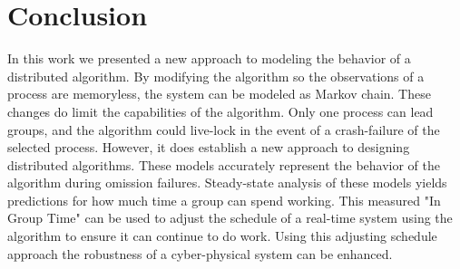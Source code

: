 
\section{Conclusion}

In this work we presented a new approach to modeling the behavior of a distributed algorithm.
By modifying the algorithm so the observations of a process are memoryless, the system can be modeled as Markov chain.
These changes do limit the capabilities of the algorithm.
Only one process can lead groups, and the algorithm could live-lock in the event of a crash-failure of the selected process.
However, it does establish a new approach to designing distributed algorithms.
These models accurately represent the behavior of the algorithm during omission failures.
Steady-state analysis of these models yields predictions for how much time a group can spend working.
This measured "In Group Time" can be used to adjust the schedule of a real-time system using the algorithm to ensure it can continue to do work.
Using this adjusting schedule approach the robustness of a cyber-physical system can be enhanced.
